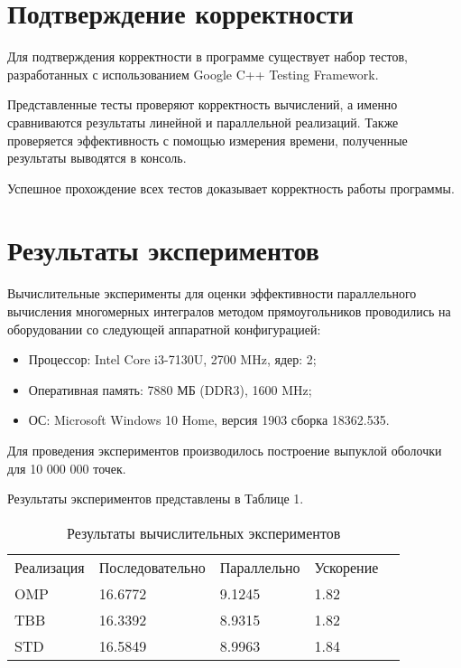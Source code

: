 \documentclass{report}
\begin{document}
\section*{Подтверждение корректности}
Для подтверждения корректности в программе существует набор тестов, разработанных с использованием Google C++ Testing Framework.
\par 
Представленные тесты проверяют корректность вычислений, а именно сравниваются результаты линейной и параллельной реализаций. Также проверяется эффективность с помощью измерения времени, полученные результаты выводятся в консоль.
\par Успешное прохождение всех тестов доказывает корректность работы программы.
\newpage

\section*{Результаты экспериментов}
Вычислительные эксперименты для оценки эффективности параллельного вычисления многомерных интегралов методом прямоугольников проводились на оборудовании со следующей аппаратной конфигурацией:

\begin{itemize}
\item Процессор: Intel Core i3-7130U, 2700 MHz, ядер: 2;
\item Оперативная память: 7880 МБ (DDR3), 1600 MHz;
\item ОС: Microsoft Windows 10 Home, версия 1903 сборка 18362.535.
\end{itemize}

\par Для проведения экспериментов производилось построение выпуклой оболочки для 10 000 000 точек.
\par Результаты экспериментов представлены в Таблице 1.

\begin{table}[!h]
\caption{Результаты вычислительных экспериментов}
\centering
\begin{tabular}{lllll}
Реализация & Последовательно & Параллельно & Ускорение  \\
OMP        & 16.6772          & 9.1245     & 1.82       \\
TBB       & 16.3392         & 8.9315     & 1.82       \\
STD        & 16.5849         & 8.9963     & 1.84       \\
\end{tabular}
\end{table}
\end{document}

